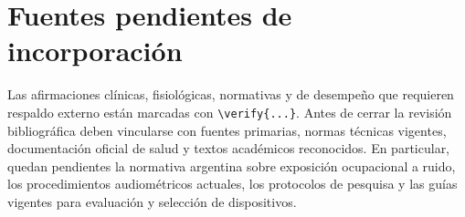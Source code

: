 \section{Fuentes pendientes de incorporación}
\label{sec:u8-fuentes}

Las afirmaciones clínicas, fisiológicas, normativas y de desempeño que
requieren respaldo externo están marcadas con \verb|\verify{...}|. Antes de
cerrar la revisión bibliográfica deben vincularse con fuentes primarias,
normas técnicas vigentes, documentación oficial de salud y textos académicos
reconocidos. En particular, quedan pendientes la normativa argentina sobre
exposición ocupacional a ruido, los procedimientos audiométricos actuales,
los protocolos de pesquisa y las guías vigentes para evaluación y selección
de dispositivos.
